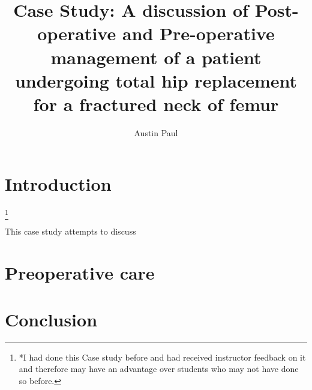 \documentclass[a4paper,man,british]{apa6}
\title{Case Study: A discussion of Post-operative and Pre-operative management of a patient undergoing total hip replacement for a fractured neck of femur}
\author{Austin Paul}
\affiliation{RMIT UNIVERSITY \\ s3634517 \\ Word Count : 986}
\newcommand\blfootnote[1]{%
  \begingroup
  \renewcommand\thefootnote{}\footnote{#1}%
  \addtocounter{footnote}{-1}%
  \endgroup
}
\begin{document}
\maketitle

\section{}
\section{Introduction} %
%
\blfootnote{*I had done this Case study before and had received instructor feedback on it and therefore may have an advantage over students who may not have done so before.}
This case study attempts to discuss 




\section{Preoperative care} %



\section{} %




\newpage
\section{Conclusion}%



\end{document}
